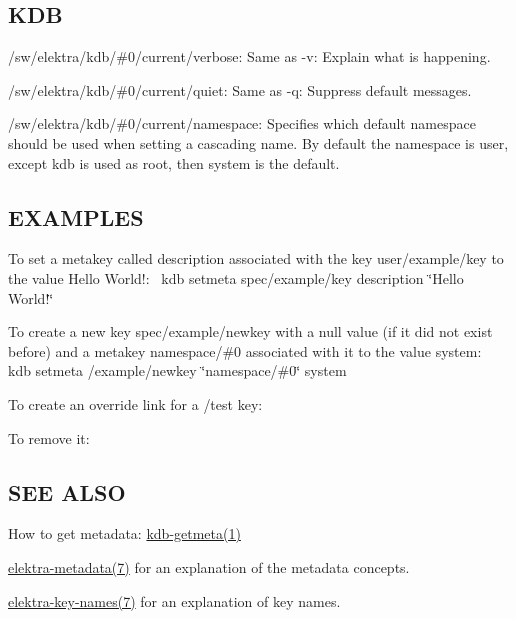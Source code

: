 \subsection*{K\+DB}


\begin{DoxyItemize}
\item {\ttfamily /sw/elektra/kdb/\#0/current/verbose}\+: Same as {\ttfamily -\/v}\+: Explain what is happening.
\item {\ttfamily /sw/elektra/kdb/\#0/current/quiet}\+: Same as {\ttfamily -\/q}\+: Suppress default messages.
\item {\ttfamily /sw/elektra/kdb/\#0/current/namespace}\+: Specifies which default namespace should be used when setting a cascading name. By default the namespace is {\ttfamily user}, except {\ttfamily kdb} is used as root, then {\ttfamily system} is the default.
\end{DoxyItemize}

\subsection*{E\+X\+A\+M\+P\+L\+ES}

To set a metakey called {\ttfamily description} associated with the key {\ttfamily user/example/key} to the value {\ttfamily Hello World!}\+:~\newline
 {\ttfamily kdb setmeta spec/example/key description \char`\"{}\+Hello World!\char`\"{}}

To create a new key {\ttfamily spec/example/newkey} with a null value (if it did not exist before) and a metakey {\ttfamily namespace/\#0} associated with it to the value {\ttfamily system}\+:~\newline
 {\ttfamily kdb setmeta /example/newkey \char`\"{}namespace/\#0\char`\"{} system}

To create an override link for a {\ttfamily /test} key\+: 


To remove it\+: 


\subsection*{S\+EE A\+L\+SO}


\begin{DoxyItemize}
\item How to get metadata\+: \hyperlink{doc_help_kdb-getmeta_md}{kdb-\/getmeta(1)}
\item \hyperlink{doc_help_elektra-metadata_md}{elektra-\/metadata(7)} for an explanation of the metadata concepts.
\item \hyperlink{doc_help_elektra-key-names_md}{elektra-\/key-\/names(7)} for an explanation of key names. 
\end{DoxyItemize}
